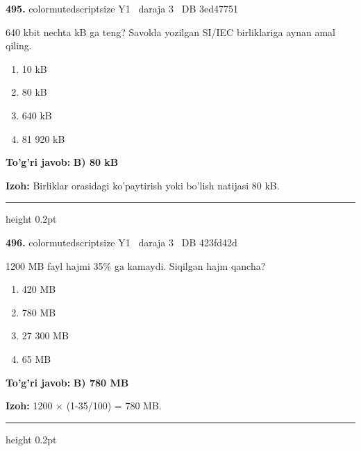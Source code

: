 \documentclass[10pt,a4paper,oneside]{article}
\begin{document}
\noindent\textbf{\color{ink}495.}  {color{muted}scriptsize Y1 \textbullet\ daraja 3 \textbullet\ DB 3ed47751}
\par
640 kbit nechta kB ga teng? Savolda yozilgan SI/IEC birliklariga aynan amal qiling.
\begin{enumerate}[label=\Alph*),leftmargin=9mm]
\item 10 kB
\item 80 kB
\item 640 kB
\item 81 920 kB
\end{enumerate}
\begin{tcolorbox}[enhanced,breakable,colback=teal!4,colframe=teal!50!black,boxrule=0.5pt,arc=1.1mm,left=3mm,right=3mm,top=1.7mm,bottom=1.7mm,before skip=2mm,after skip=2mm]
\textbf{\color{teal}To'g'ri javob:} \textbf{B) 80 kB}
\par\smallskip
\textbf{Izoh:} Birliklar orasidagi ko'paytirish yoki bo'lish natijasi 80 kB.
\end{tcolorbox}
\vspace{2mm}\hrule height 0.2pt \vspace{3mm}

\noindent\textbf{\color{ink}496.}  {color{muted}scriptsize Y1 \textbullet\ daraja 3 \textbullet\ DB 423fd42d}
\par
1200 MB fayl hajmi 35\% ga kamaydi. Siqilgan hajm qancha?
\begin{enumerate}[label=\Alph*),leftmargin=9mm]
\item 420 MB
\item 780 MB
\item 27 300 MB
\item 65 MB
\end{enumerate}
\begin{tcolorbox}[enhanced,breakable,colback=teal!4,colframe=teal!50!black,boxrule=0.5pt,arc=1.1mm,left=3mm,right=3mm,top=1.7mm,bottom=1.7mm,before skip=2mm,after skip=2mm]
\textbf{\color{teal}To'g'ri javob:} \textbf{B) 780 MB}
\par\smallskip
\textbf{Izoh:} 1200 \ensuremath{\times} (1-35/100) = 780 MB.
\end{tcolorbox}
\vspace{2mm}\hrule height 0.2pt \vspace{3mm}
\end{document}
